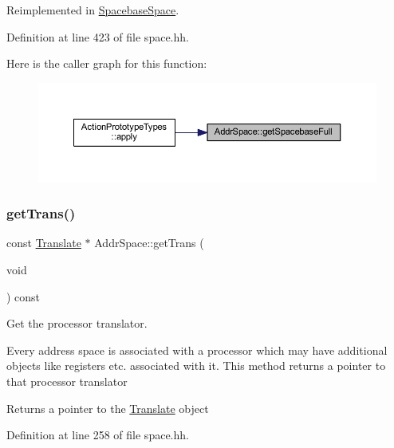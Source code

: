 Reimplemented in \mbox{\hyperlink{class_spacebase_space_aa6c1b1af9de6666ff998996d647ff44d}{Spacebase\+Space}}.



Definition at line 423 of file space.\+hh.

Here is the caller graph for this function\+:
\nopagebreak
\begin{figure}[H]
\begin{center}
\leavevmode
\includegraphics[width=350pt]{class_addr_space_a8fb25cf630f64ad73a137393b48067a0_icgraph}
\end{center}
\end{figure}
\mbox{\label{class_addr_space_a3a0cdcba6345332bd0f557a449de6948}} 
\subsubsection{\texorpdfstring{getTrans()}{getTrans()}}
{\footnotesize\ttfamily const \mbox{\hyperlink{class_translate}{Translate}} $\ast$ Addr\+Space\+::get\+Trans (\begin{DoxyParamCaption}\item[{void}]{ }\end{DoxyParamCaption}) const\hspace{0.3cm}{\ttfamily [inline]}}



Get the processor translator. 

Every address space is associated with a processor which may have additional objects like registers etc. associated with it. This method returns a pointer to that processor translator \begin{DoxyReturn}{Returns}
a pointer to the \mbox{\hyperlink{class_translate}{Translate}} object 
\end{DoxyReturn}


Definition at line 258 of file space.\+hh.

